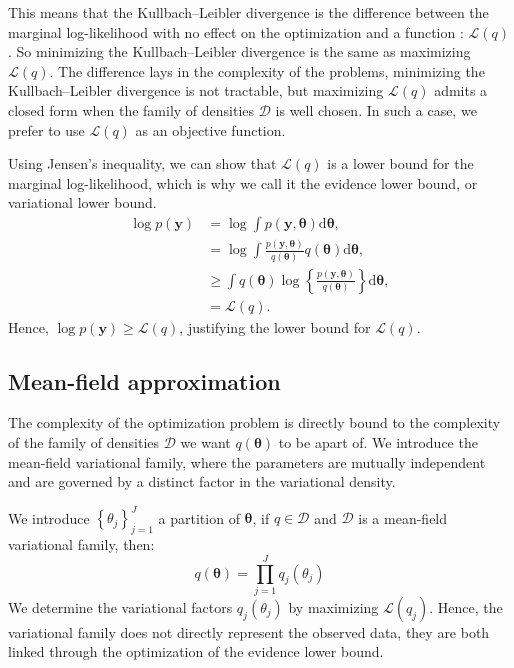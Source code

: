\documentclass{article}
\numberwithin{equation}{section}
\begin{document}
This means that the Kullbach--Leibler divergence is the difference between the marginal log-likelihood with no effect on the optimization and a function : $\mathcal{L}(q)$. So minimizing the Kullbach--Leibler divergence is the same as maximizing $\mathcal{L}(q)$. The difference lays in the complexity of the problems, minimizing the Kullbach--Leibler divergence is not tractable, but maximizing $\mathcal{L}(q)$ admits a closed form when the family of densities $\mathcal{D}$ is well chosen. In such a case, we prefer to use $\mathcal{L}(q)$ as an objective function.

Using Jensen's inequality, we can show that $\mathcal{L}(q)$ is a lower bound for the marginal log-likelihood, which is why we call it the evidence lower bound, or variational lower bound.
\begin{align*}
\log p(\boldsymbol{y}) &= \log \int p(\boldsymbol{y}, \boldsymbol{\theta}) \mathrm{d}\boldsymbol{\theta},\\
&= \log \int \frac{p(\boldsymbol{y}, \boldsymbol{\theta})}{q(\boldsymbol{\theta})}q(\boldsymbol{\theta})\mathrm{d}\boldsymbol{\theta}
,\\
&\geq \int q(\boldsymbol{\theta}) \log \left\lbrace \frac{p(\boldsymbol{y}, \boldsymbol{\theta})}{q(\boldsymbol{\theta})} \right\rbrace \mathrm{d}\boldsymbol{\theta},\\
&= \mathcal{L}(q).
\end{align*}
Hence, $\log p(\boldsymbol{y}) \geq \mathcal{L}(q)$, justifying the lower bound for $\mathcal{L}(q)$.

\subsection{Mean-field approximation}
The complexity of the optimization problem is directly bound to the complexity of the family of densities $\mathcal{D}$ we want $q(\boldsymbol{\theta})$ to be apart of. We introduce the mean-field variational family, where the parameters are mutually independent and are governed by a distinct factor in the variational density.

We introduce $\left\lbrace \theta_j\right\rbrace_{j=1}^J$ a partition of $\boldsymbol{\theta}$, if $q \in \mathcal{D}$ and $\mathcal{D}$ is a mean-field variational family, then:
\begin{equation*}
q(\boldsymbol{\theta}) = \prod_{j=1}^J q_j(\theta_j)
\end{equation*}
We determine the variational factors $q_j(\theta_j)$ by maximizing $\mathcal{L}(q_j)$. Hence, the variational family does not directly represent the observed data, they are both linked through the optimization of the evidence lower bound.
\end{document}
